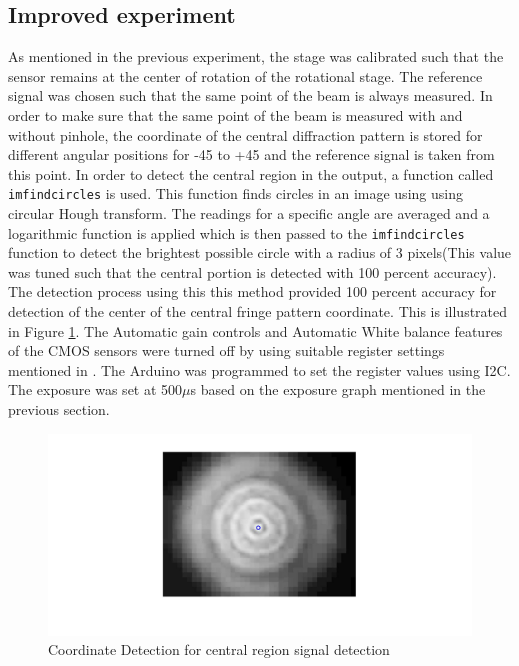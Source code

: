 \subsection{Improved experiment}
As mentioned in the previous experiment, the stage was calibrated such that the sensor remains at the center of rotation of the rotational stage. The reference signal was chosen such that the same point of the beam is always measured. In order to make sure that the same point of the beam is measured with and without pinhole, the coordinate of the central diffraction pattern is stored for different angular positions for -45 to +45 and the reference signal is taken from this point. In order to detect the central region in the output, a function called \texttt{imfindcircles} is used\cite{imfindcircles}. This function finds circles in an image using using circular Hough transform. The readings for a specific angle are averaged and a logarithmic function is applied which is then passed to the \texttt{imfindcircles} function to detect the brightest possible circle with a radius of 3 pixels(This value was tuned such that the  central portion is detected with 100 percent accuracy). The detection process using this this method provided 100 percent accuracy for detection of the center of the central fringe pattern coordinate. This is illustrated in Figure \ref{fig:center_calib}. The Automatic gain controls and Automatic White balance features of the CMOS sensors were turned off by using suitable register settings mentioned in \cite{OV2640DS}. The Arduino was programmed to set the register values using I2C. The exposure was set at 500$\mu$s based on the exposure graph mentioned in the previous section.
\begin{figure}[!h]
\centering
\includegraphics[scale=0.300]{pics/CentralRegionTracking.jpg}
\caption{Coordinate Detection for central region signal detection}
\label{fig:center_calib}
\end{figure}

